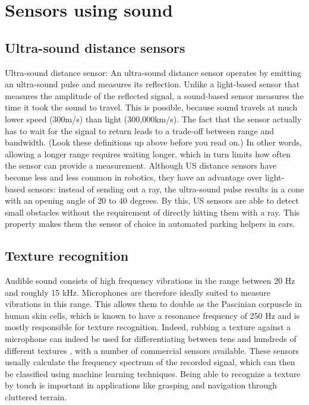 \section{Sensors using sound}
\subsection{Ultra-sound distance sensors}
Ultra-sound distance sensor: An ultra-sound distance sensor operates by emitting an ultra-sound pulse and measures its reflection. Unlike a light-based sensor that measures the amplitude of the reflected signal, a sound-based sensor measures the time it took the sound to travel. This is possible, because sound travels at much lower speed (300m/s) than light (300,000km/s). The fact that the sensor actually has to wait for the signal to return leads to a trade-off between range and bandwidth. (Look these definitions up above before you read on.) In other words, allowing a longer range requires waiting longer, which in turn limits how often the sensor can provide a measurement. Although US distance sensors have become less and less common in robotics, they have an advantage over light-based sensors: instead of sending out a ray, the ultra-sound pulse results in a cone with an opening angle of 20 to 40 degrees. By this, US sensors are able to detect small obstacles without the requirement of directly hitting them with a ray. This property makes them the sensor of choice in automated parking helpers in cars.

\subsection{Texture recognition}
Audible sound consists of high frequency vibrations in the range between 20 Hz and roughly 15 kHz. Microphones are therefore ideally suited to measure vibrations in this range. This allows them to double as the Pascinian corpuscle in human skin cells, which is known to have a resonance frequency of 250 Hz and is mostly responsible for texture recognition. Indeed, rubbing a texture against a microphone can indeed be used for differentiating between tens and hundreds of different textures \cite{hughes14}, with a number of commercial sensors available. These sensors usually calculate the frequency spectrum of the recorded signal, which can then be classified using machine learning techniques. Being able to recognize a texture by touch is important in applications like grasping and navigation through cluttered terrain.

